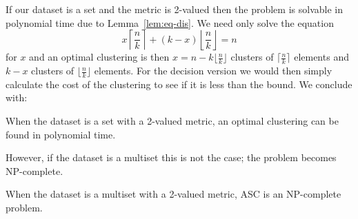 If our dataset is a set and the metric is 2-valued then the problem is
solvable in polynomial time due to Lemma~\ref{lem:eq-dis}.  We need only solve
the equation
\begin{equation*}
  x \left\lceil\frac{n}{k}\right\rceil
  + (k-x) \left\lfloor\frac{n}{k}\right\rfloor = n
\end{equation*}
for $x$ and an optimal clustering is then $x = n-k\lfloor\frac{n}{k}\rfloor$
clusters of $\lceil\frac{n}{k}\rceil$ elements and $k-x$ clusters of
$\lfloor\frac{n}{k}\rfloor$ elements.  For the decision version we would then
simply calculate the cost of the clustering to see if it is less than the
bound.  We conclude with:
\begin{thm}
  When the dataset is a set with a 2-valued metric, an optimal clustering can
  be found in polynomial time.
\end{thm}

However, if the dataset is a multiset this is not the case; the problem
becomes NP-complete.
\begin{thm}
  \label{thm:2-met-multiset-np-complete}
  When the dataset is a multiset with a 2-valued metric, ASC is an NP-complete
  problem.
\end{thm}

